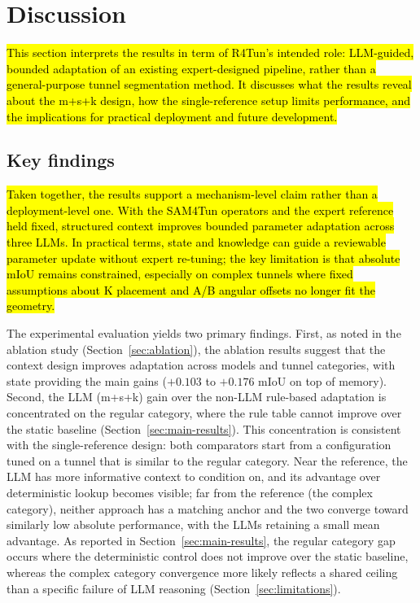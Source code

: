 \documentclass[a4paper,fleqn]{cas-dc}
\begin{document}
{%
\section{Discussion}\label{sec:discussion}

\hl{This section interprets the results in term of R4Tun's intended role: LLM-guided, bounded adaptation of an existing expert-designed pipeline, rather than a general-purpose tunnel segmentation method. It discusses what the results reveal about the m+s+k design, how the single-reference setup limits performance, and the implications for practical deployment and future development.}

\subsection{Key findings}

\hl{Taken together, the results support a mechanism-level claim rather than a deployment-level one. With the SAM4Tun operators and the expert reference held fixed, structured context improves bounded parameter adaptation across three LLMs. In practical terms, state and knowledge can guide a reviewable parameter update without expert re-tuning; the key limitation is that absolute mIoU remains constrained, especially on complex tunnels where fixed assumptions about K placement and A/B angular offsets no longer fit the geometry.}

The experimental evaluation yields two primary findings. First, as noted in the ablation study (Section~\ref{sec:ablation}), the ablation results suggest that the context design improves adaptation across models and tunnel categories, with state providing the main gains ($+0.103$ to $+0.176$ mIoU on top of memory). Second, the LLM (m+s+k) gain over the non-LLM rule-based adaptation is concentrated on the regular category, where the rule table cannot improve over the static baseline (Section~\ref{sec:main-results}). This concentration is consistent with the single-reference design: both comparators start from a configuration tuned on a tunnel that is similar to the regular category. Near the reference, the LLM has more informative context to condition on, and its advantage over deterministic lookup becomes visible; far from the reference (the complex category), neither approach has a matching anchor and the two converge toward similarly low absolute performance, with the LLMs retaining a small mean advantage. As reported in Section~\ref{sec:main-results}, the regular category gap occurs where the deterministic control does not improve over the static baseline, whereas the complex category convergence more likely reflects a shared ceiling than a specific failure of LLM reasoning (Section~\ref{sec:limitations}).


}
\end{document}
